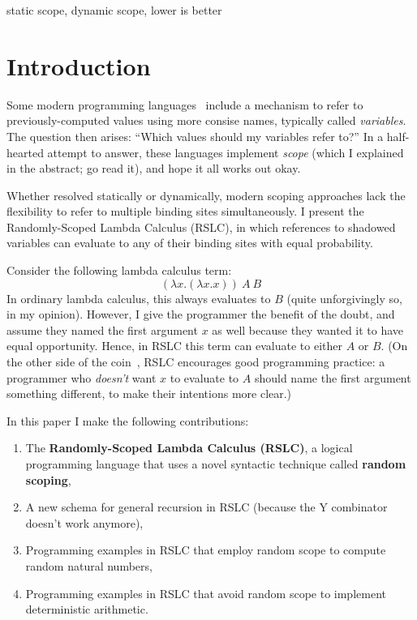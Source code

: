 \documentclass[10pt]{sigplanconf}
\begin{document}

\keywords
static scope, dynamic scope, lower is better

\section{Introduction}

Some modern programming languages~\cite{wikiplia,python,lambda,sml,GoLang,RustLang,mla,haskell98,patenttroll} include a mechanism to refer to previously-computed values using more consise names, typically called {\em variables}. The question then arises: ``Which values should my variables refer to?''
In a half-hearted attempt to answer, these languages implement {\em scope} (which I explained in the abstract; go read it), and hope it all works out okay.

Whether resolved statically or dynamically, modern scoping approaches lack the flexibility to refer to multiple binding sites simultaneously.
I present the Randomly-Scoped Lambda Calculus (RSLC), in which references to shadowed variables can evaluate to any of their binding sites with equal probability.

Consider the following lambda calculus term:
\[ (\lambda x. (\lambda x. x))~A~B \]
In ordinary lambda calculus, this always evaluates to $B$ (quite unforgivingly so, in my opinion).
However, I give the programmer the benefit of the doubt, and assume they named the first argument $x$ as well because they wanted it to have equal opportunity. Hence, in RSLC this term can evaluate to either $A$ or $B$.
(On the other side of the coin~\cite{twoface}, RSLC encourages good programming practice: a programmer who {\em doesn't} want $x$ to evaluate to $A$ should name the first argument something different, to make their intentions more clear.)

In this paper I make the following contributions:
\begin{enumerate}
	\item The {\bf Randomly-Scoped Lambda Calculus (RSLC)}, a logical programming language that uses a novel syntactic technique called {\bf random scoping},
	\item A new schema for general recursion in RSLC (because the Y combinator doesn't work anymore),
	\item Programming examples in RSLC that employ random scope to compute random natural numbers,
	\item Programming examples in RSLC that avoid random scope to implement deterministic arithmetic.
\end{enumerate}
\end{document}
